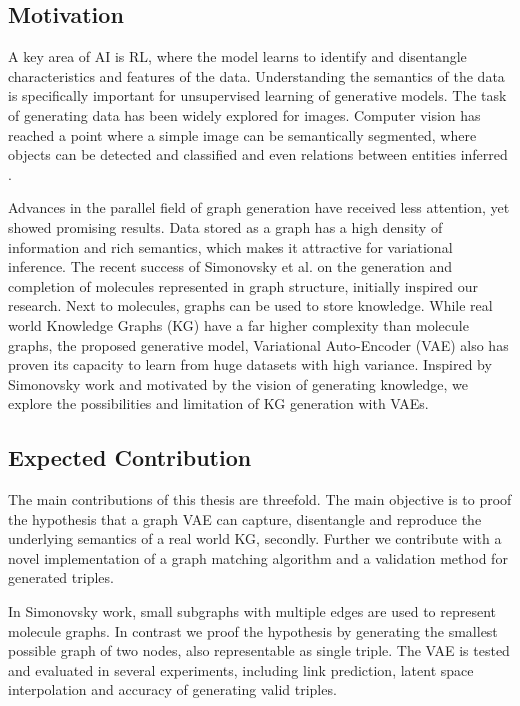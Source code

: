 \subsection{Motivation}

A key area of AI is RL, where the model learns to identify and disentangle characteristics and features of the data. Understanding the semantics of the data is specifically important for unsupervised learning of generative models. 
The task of generating data has been widely explored for images. Computer vision has reached a point where a simple image can be semantically segmented, where objects can be detected and classified and even relations between entities inferred \cite{kipf_contrastive_2020}.

Advances in the parallel field of graph generation have received less attention, yet showed promising results. Data stored as a graph has a high density of information and rich semantics, which makes it attractive for variational inference. The recent success of Simonovsky et al. \cite{simonovsky_graphvae_2018} on the generation and completion of molecules represented in graph structure, initially inspired our research. Next to molecules, graphs can be used to store knowledge. While real world Knowledge Graphs (KG) have a far higher complexity than molecule graphs, the proposed generative model, Variational Auto-Encoder (VAE) also has proven its capacity to learn from huge datasets with high variance. Inspired by Simonovsky work and motivated by the vision of generating knowledge, we explore the possibilities and limitation of KG generation with VAEs.



\subsection{Expected Contribution}

The main contributions of this thesis are threefold. The main objective is to proof the hypothesis that a graph VAE can capture, disentangle and reproduce the underlying semantics of a real world KG, secondly. Further we contribute with a novel implementation of a graph matching algorithm and a validation method for generated triples. 

In Simonovsky \cite{simonovsky_graphvae_2018} work, small subgraphs with multiple edges are used to represent molecule graphs. In contrast we proof the hypothesis by generating the smallest possible graph of two nodes, also representable as single triple. The VAE is tested and evaluated in several experiments, including link prediction, latent space interpolation and accuracy of generating valid triples.


